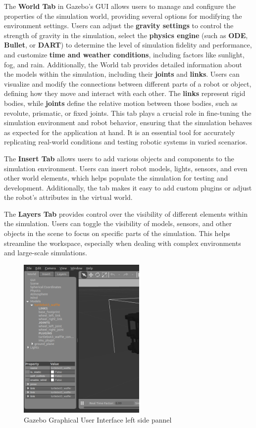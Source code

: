 \documentclass[../../main]{subfiles}
\begin{document}
The \textbf{World Tab} in Gazebo’s GUI allows users to manage and configure the 
properties of the simulation world, providing several options for modifying the 
environment settings. Users can adjust the \textbf{gravity settings} to control the 
strength of gravity in the simulation, select the \textbf{physics engine} (such as 
\textbf{ODE}, \textbf{Bullet}, or \textbf{DART}) to determine the level of simulation 
fidelity and performance, and customize \textbf{time and weather conditions}, including 
factors like sunlight, fog, and rain. Additionally, the World tab provides detailed 
information about the models within the simulation, including their \textbf{joints} and 
\textbf{links}. Users can visualize and modify the connections between different parts 
of a robot or object, defining how they move and interact with each other. The 
\textbf{links} represent rigid bodies, while \textbf{joints} define the relative motion 
between those bodies, such as revolute, prismatic, or fixed joints. This tab plays a 
crucial role in fine-tuning the simulation environment and robot behavior, ensuring that 
the simulation behaves as expected for the application at hand. It is an essential tool 
for accurately replicating real-world conditions and testing robotic systems in varied 
scenarios.

The \textbf{Insert Tab} allows users to add various objects and 
components to the simulation environment. Users can insert robot models, lights, 
sensors, and even other world elements, which helps populate the simulation for 
testing and development. Additionally, the tab makes it easy to add custom plugins 
or adjust the robot's attributes in the virtual world.

The \textbf{Layers Tab} provides control over the visibility of 
different elements within the simulation. Users can toggle the visibility of models, 
sensors, and other objects in the scene to focus on specific parts of the simulation. 
This helps streamline the workspace, especially when dealing with complex environments 
and large-scale simulations.

\begin{figure}[H]
    \centering
\includegraphics[width=0.55\textwidth]{fig/gui_left_tab.png}
\caption{Gazebo Graphical User Interface left side pannel}
\label{Left side pannel} %
\end{figure}
\end{document}
